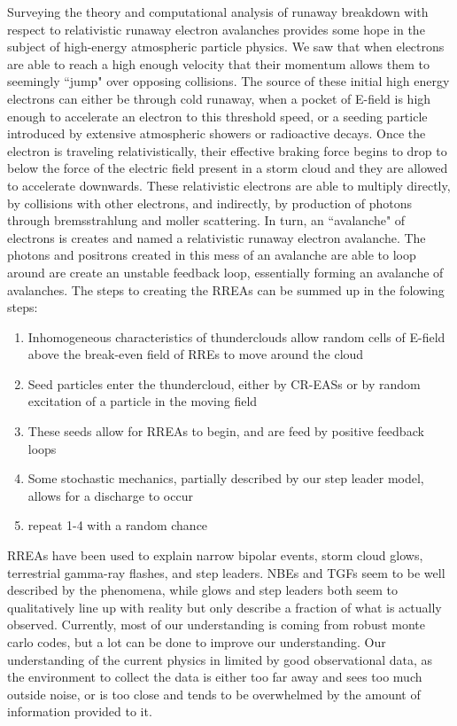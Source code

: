 \documentclass[11pt]{article}
\begin{document}
\begin{multicols*}{2}
    Surveying the theory and computational analysis of runaway breakdown with respect to relativistic runaway electron avalanches provides some hope in the subject of high-energy atmospheric particle physics. We saw that when electrons are able to reach a high enough velocity that their momentum allows them to seemingly ``jump" over opposing collisions. The source of these initial high energy electrons can either be through cold runaway, when a pocket of E-field is high enough to accelerate an electron to this threshold speed, or a seeding particle introduced by extensive atmospheric showers or radioactive decays. Once the electron is traveling relativistically, their effective braking force begins to drop to below the force of the electric field present in a storm cloud and they are allowed to accelerate downwards. These relativistic electrons are able to multiply directly, by collisions with other electrons, and indirectly, by production of photons through bremsstrahlung and moller scattering. In turn, an ``avalanche" of electrons is creates and named a relativistic runaway electron avalanche. The photons and positrons created in this mess of an avalanche are able to loop around are create an unstable feedback loop, essentially forming an avalanche of avalanches. The steps to creating the RREAs can be summed up in the folowing steps:
    
    \begin{enumerate}
        \item Inhomogeneous characteristics of thunderclouds allow random cells of E-field above the break-even field of RREs to move around the cloud
        \item Seed particles enter the thundercloud, either by CR-EASs or by random excitation of a particle in the moving field
        \item These seeds allow for RREAs to begin, and are feed by positive feedback loops
        \item Some stochastic mechanics, partially described by our step leader model, allows for a discharge to occur
        \item repeat 1-4 with a random chance
    \end{enumerate}

    RREAs have been used to explain narrow bipolar events, storm cloud glows, terrestrial gamma-ray flashes, and step leaders. NBEs and TGFs seem to be well described by the phenomena, while glows and step leaders both seem to qualitatively line up with reality but only describe a fraction of what is actually observed. Currently, most of our understanding is coming from robust monte carlo codes, but a lot can be done to improve our understanding. Our understanding of the current physics in limited by good observational data, as the environment to collect the data is either too far away and sees too much outside noise, or is too close and tends to be overwhelmed by the amount of information provided to it. 
    


\end{multicols*}
\end{document}
